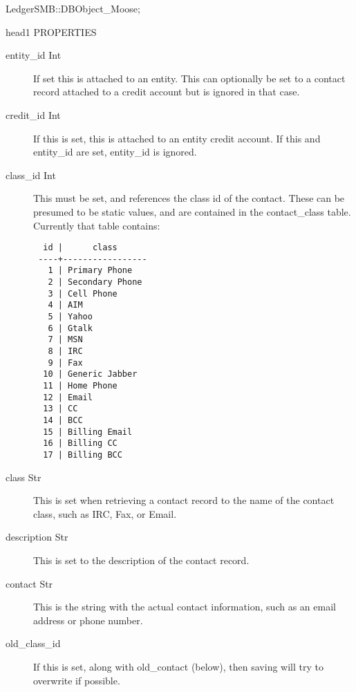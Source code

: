 \begin{description}
\begin{description}
\begin{description}
\begin{description}
\begin{description}
\begin{description}
\begin{description}
\begin{description}
\begin{description}
\item[{LedgerSMB::DBObject\_Moose;}] \mbox{}\end{description}


head1 PROPERTIES

\begin{description}

\item[{entity\_id Int}] \mbox{}

If set this is attached to an entity.  This can optionally be set to a contact
record attached to a credit account but is ignored in that case.


\item[{credit\_id Int}] \mbox{}

If this is set, this is attached to an entity credit account.  If this and
entity\_id are set, entity\_id is ignored.


\item[{class\_id Int}] \mbox{}

This must be set, and references the class id of the contact.  These can be
presumed to be static values, and are contained in the contact\_class table.
Currently that table contains:

\begin{verbatim}
  id |      class      
 ----+-----------------
   1 | Primary Phone
   2 | Secondary Phone
   3 | Cell Phone
   4 | AIM
   5 | Yahoo
   6 | Gtalk
   7 | MSN
   8 | IRC
   9 | Fax
  10 | Generic Jabber
  11 | Home Phone
  12 | Email
  13 | CC
  14 | BCC
  15 | Billing Email
  16 | Billing CC
  17 | Billing BCC
\end{verbatim}

\item[{class Str}] \mbox{}

This is set when retrieving a contact record to the name of the contact class,
such as IRC, Fax, or Email.


\item[{description Str}] \mbox{}

This is set to the description of the contact record.


\item[{contact Str}] \mbox{}

This is the string with the actual contact information, such as an email address
or phone number.


\item[{old\_class\_id}] \mbox{}

If this is set, along with old\_contact (below), then saving will try to overwrite
if possible.



\end{description}
\end{description}
\end{description}
\end{description}
\end{description}
\end{description}
\end{description}
\end{description}
\end{description}
